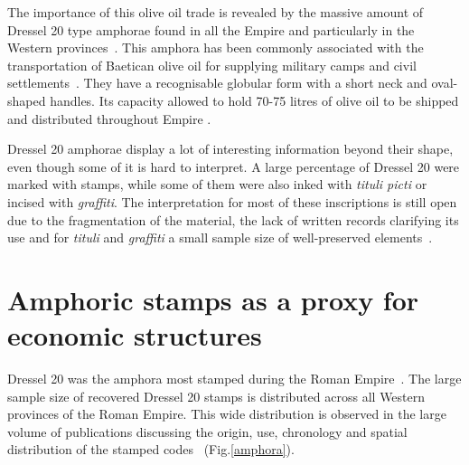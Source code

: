 The importance of this olive oil trade is revealed by the massive amount of Dressel 20 type amphorae found in all the Empire and particularly in the Western provinces~\citep{dressel_ricerche_1878,millet_anforas_1998}. This amphora has been commonly associated with the transportation of Baetican olive oil for supplying military camps and civil settlements~\citep{berni_millet_epigrafianforica_2008}. They have a recognisable globular form with a short neck and oval-shaped handles. Its capacity allowed to hold 70-75 litres of olive oil to be shipped and distributed throughout Empire \citep{berni_dressel_2016}.

Dressel 20 amphorae display a lot of interesting information beyond their shape, even though some of it is hard to interpret. A large percentage of Dressel 20 were marked with stamps, while some of them were also inked with \textit{tituli picti} or incised with \textit{graffiti}. The interpretation for most of these inscriptions is still open due to the fragmentation of the material, the lack of written records clarifying its use and for \textit{tituli} and \textit{graffiti} a small sample size of well-preserved elements~\citep{aguilera_evolucion_2007,rovira_guardiola_grafitos_2007}. 

\section{Amphoric stamps as a proxy for economic structures}
\label{sec:2}

Dressel 20 was the amphora most stamped during the Roman Empire~\citep[18]{millet_anforas_1998}. The large sample size of recovered Dressel 20 stamps is distributed across all Western provinces of the Roman Empire. This wide distribution is observed in the large volume of publications discussing the origin, use, chronology and spatial distribution of the stamped codes~\citep{dressel_ricerche_1878,rodriguez_economioleicola_1977,chicepi1985,millet_anforas_1998, remesal_sellar_2016} (Fig.\ref{amphora}).

